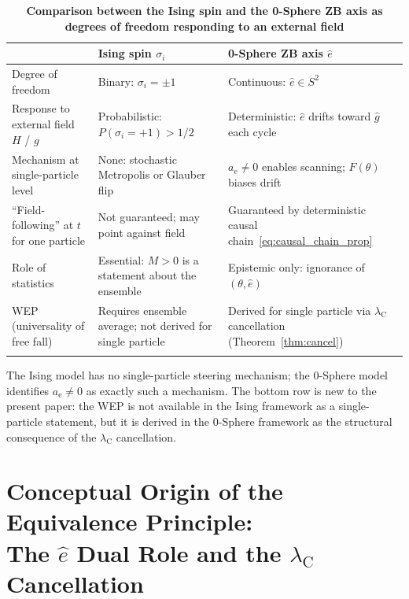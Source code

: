 \documentclass[%
 reprint, amsmath,amssymb, aps, prb, ]{revtex4-2}
\numberwithin{equation}{section}
\newcommand{\iphase}{\theta}
\newcommand{\lambdaC}{\lambda_{\mathrm{C}}}
\newcommand{\anom}{a_{\mathrm{e}}}
\begin{document}
\begin{table}[t!]
\centering
\caption{\textbf{Comparison between the Ising spin and the 0-Sphere ZB axis as degrees of freedom responding to an external field}}
\label{tab:ising_vs_0sphere}
\renewcommand{\arraystretch}{1.6}
\begin{tabular}{p{3.5cm}p{5.5cm}p{6.5cm}}
\toprule
 & \textbf{Ising spin $\sigma_i$} & \textbf{0-Sphere ZB axis $\hat{e}$} \\
\midrule
Degree of freedom
& Binary: $\sigma_i = \pm 1$
& Continuous: $\hat{e} \in S^2$ \\
\addlinespace[0.3cm]
Response to external field $H$ / $g$
& Probabilistic: $P(\sigma_i=+1) > 1/2$
& Deterministic: $\hat{e}$ drifts toward $\hat{g}$ each cycle \\
\addlinespace[0.3cm]
Mechanism at single-particle level
& None: stochastic Metropolis or Glauber flip
& $\anom \neq 0$ enables scanning; $F(\iphase)$ biases drift \\
\addlinespace[0.3cm]
``Field-following'' at $t$ for one particle
& Not guaranteed; may point against field
& Guaranteed by deterministic causal chain~\eqref{eq:causal_chain_prop} \\
\addlinespace[0.3cm]
Role of statistics
& Essential: $M>0$ is a statement about the ensemble
& Epistemic only: ignorance of $(\iphase,\hat{e})$ \\
\addlinespace[0.3cm]
WEP (universality of free fall)
& Requires ensemble average; not derived for single particle
& Derived for single particle via $\lambdaC$ cancellation (Theorem~\ref{thm:cancel}) \\
\addlinespace[0.2cm]
\bottomrule
\end{tabular}
\vspace{0.2cm}
\begin{minipage}{0.95\textwidth}
\justifying\footnotesize
The Ising model has no single-particle steering mechanism; the 0-Sphere model identifies $\anom \neq 0$ as exactly such a mechanism. The bottom row is new to the present paper: the WEP is not available in the Ising framework as a single-particle statement, but it is derived in the 0-Sphere framework as the structural consequence of the $\lambdaC$ cancellation.
\end{minipage}
\end{table}

\appendix
\section{Conceptual Origin of the Equivalence Principle:\\
         The $\hat{e}$ Dual Role and the $\lambdaC$ Cancellation}
\label{app:EP_origin}
\end{document}
